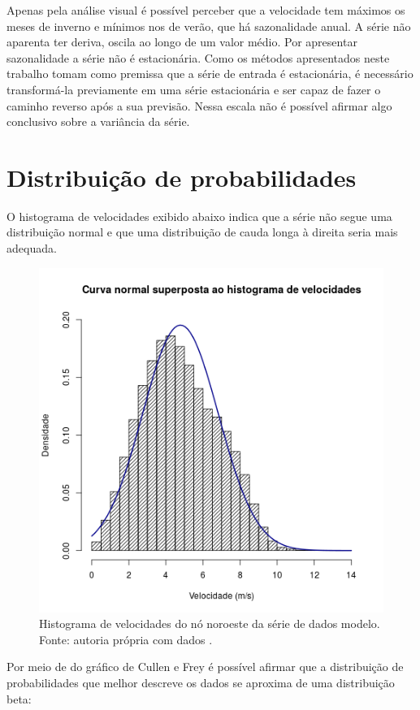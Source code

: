 \documentclass[
	12pt,				%
	openright,			%
	oneside,			%
	a4paper,			%
	english,			%
	french,				%
	spanish,			%
	brazil				%
	]{abntex2}
\begin{document}
Apenas pela análise visual é possível perceber que a velocidade tem máximos os meses de inverno e mínimos nos de verão, que há sazonalidade anual. A série não aparenta ter deriva, oscila ao longo de um valor médio. Por apresentar sazonalidade a série não é estacionária. Como os métodos apresentados neste trabalho tomam como premissa que a série de entrada é estacionária, é necessário transformá-la previamente em uma série estacionária e ser capaz de fazer o caminho reverso após a sua previsão. Nessa escala não é possível afirmar algo conclusivo sobre a variância da série.

\section{Distribuição de probabilidades}

O histograma de velocidades exibido abaixo indica que a série não segue uma distribuição normal e que uma distribuição de cauda longa à direita seria mais adequada. 

\begin{figure}[h]
    \centering
	\includegraphics[scale=0.7]{normal_overlay}
	\caption{Histograma de velocidades do nó noroeste da série de dados modelo. Fonte: autoria própria com dados \cite{era5}.}
\end{figure}
\FloatBarrier

Por meio de do gráfico de Cullen e Frey é possível afirmar que a distribuição de probabilidades que melhor descreve os dados se aproxima de uma distribuição beta:
\end{document}
